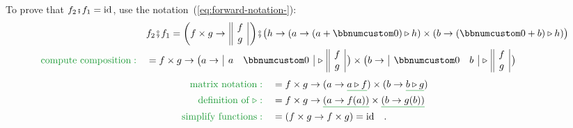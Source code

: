To prove that $f_{2}\bef f_{1}=\text{id}$, use the notation~(\ref{eq:forward-notation-}):
\begin{align*}
 & f_{2}\bef f_{1}=\bigg(f\times g\rightarrow\,\begin{array}{||c|}
f\\
g
\end{array}\,\bigg)\bef\big(h\rightarrow(a\rightarrow(a+\bbnum 0)\triangleright h)\times(b\rightarrow(\bbnum 0+b)\triangleright h)\big)\\
{\color{greenunder}\text{compute composition}:}\quad & =f\times g\rightarrow\big(a\rightarrow\,\begin{array}{|cc|}
a & \bbnum 0\end{array}\,\triangleright\,\begin{array}{||c|}
f\\
g
\end{array}\,\big)\times\big(b\rightarrow\,\begin{array}{|cc|}
\bbnum 0 & b\end{array}\,\triangleright\,\begin{array}{||c|}
f\\
g
\end{array}\,\big)
\end{align*}
\begin{align*}
{\color{greenunder}\text{matrix notation}:}\quad & =f\times g\rightarrow(a\rightarrow\gunderline{a\triangleright f})\times(b\rightarrow\gunderline{b\triangleright g})\\
{\color{greenunder}\text{definition of }\triangleright:}\quad & =f\times g\rightarrow\gunderline{\left(a\rightarrow f(a)\right)}\times\gunderline{\left(b\rightarrow g(b)\right)}\\
{\color{greenunder}\text{simplify functions}:}\quad & =\left(f\times g\rightarrow f\times g\right)=\text{id}\quad.
\end{align*}

